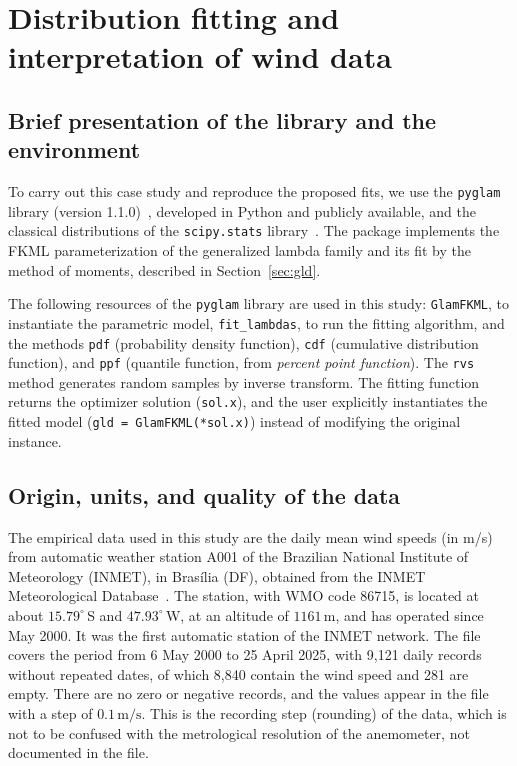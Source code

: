 \section{Distribution fitting and interpretation of wind data}\label{sec:vento}

\subsection{Brief presentation of the library and the environment}

To carry out this case study and reproduce the proposed fits, we use the \texttt{pyglam} library (version 1.1.0)~\cite{pyglam}, developed in Python and publicly available, and the classical distributions of the \texttt{scipy.stats} library~\cite{scipy2020}. The package implements the FKML parameterization of the generalized lambda family and its fit by the method of moments, described in Section~\ref{sec:gld}.

The following resources of the \texttt{pyglam} library are used in this study: \texttt{GlamFKML}, to instantiate the parametric model, \texttt{fit\_lambdas}, to run the fitting algorithm, and the methods \texttt{pdf} (probability density function), \texttt{cdf} (cumulative distribution function), and \texttt{ppf} (quantile function, from \textit{percent point function}). The \texttt{rvs} method generates random samples by inverse transform. The fitting function returns the optimizer solution (\texttt{sol.x}), and the user explicitly instantiates the fitted model (\texttt{gld = GlamFKML(*sol.x)}) instead of modifying the original instance.

\subsection{Origin, units, and quality of the data}

The empirical data used in this study are the daily mean wind speeds (in m/s) from automatic weather station A001 of the Brazilian National Institute of Meteorology (INMET), in Brasília (DF), obtained from the INMET Meteorological Database~\cite{inmet2025}. The station, with WMO code 86715, is located at about $15.79^\circ$\,S and $47.93^\circ$\,W, at an altitude of $1161$\,m, and has operated since May 2000. It was the first automatic station of the INMET network. The file covers the period from 6 May 2000 to 25 April 2025, with 9,121 daily records without repeated dates, of which 8,840 contain the wind speed and 281 are empty. There are no zero or negative records, and the values appear in the file with a step of $0.1\,\text{m/s}$. This is the recording step (rounding) of the data, which is not to be confused with the metrological resolution of the anemometer, not documented in the file.

